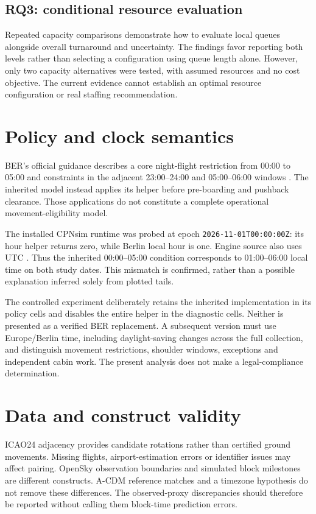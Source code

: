 \subsection{RQ3: conditional resource evaluation}
Repeated capacity comparisons demonstrate how to evaluate local queues alongside overall turnaround and uncertainty. The findings favor reporting both levels rather than selecting a configuration using queue length alone. However, only two capacity alternatives were tested, with assumed resources and no cost objective. The current evidence cannot establish an optimal resource configuration or real staffing recommendation.

\section{Policy and clock semantics}
BER's official guidance describes a core night-flight restriction from 00:00 to 05:00 and constraints in the adjacent 23:00--24:00 and 05:00--06:00 windows \cite{ber_night}. The inherited model instead applies its helper before pre-boarding and pushback clearance. Those applications do not constitute a complete operational movement-eligibility model.

The installed CPNsim runtime was probed at epoch \texttt{2026-11-01T00:00:00Z}: its hour helper returns zero, while Berlin local hour is one. Engine source also uses UTC \cite{cpnsim}. Thus the inherited 00:00--05:00 condition corresponds to 01:00--06:00 local time on both study dates. This mismatch is confirmed, rather than a possible explanation inferred solely from plotted tails.

The controlled experiment deliberately retains the inherited implementation in its policy cells and disables the entire helper in the diagnostic cells. Neither is presented as a verified BER replacement. A subsequent version must use Europe/Berlin time, including daylight-saving changes across the full collection, and distinguish movement restrictions, shoulder windows, exceptions and independent cabin work. The present analysis does not make a legal-compliance determination.

\section{Data and construct validity}
ICAO24 adjacency provides candidate rotations rather than certified ground movements. Missing flights, airport-estimation errors or identifier issues may affect pairing. OpenSky observation boundaries and simulated block milestones are different constructs. A-CDM reference matches and a timezone hypothesis do not remove these differences. The observed-proxy discrepancies should therefore be reported without calling them block-time prediction errors.

